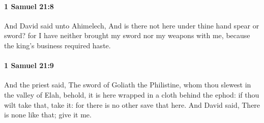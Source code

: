 		\paragraph{1 Samuel 21:8} %
			\label{1SAMUEL-21-8}

			And David said unto Ahimelech, And is there not here under thine hand spear or sword? for I have neither brought my sword nor my weapons with me, because the king’s business required haste.


		\paragraph{1 Samuel 21:9} %
			\label{1SAMUEL-21-9}

			And the priest said, The sword of Goliath the Philistine, whom thou slewest in the valley of Elah, behold, it is here wrapped in a cloth behind the ephod: if thou wilt take that, take it: for there is no other save that here. And David said, There is none like that; give it me.

